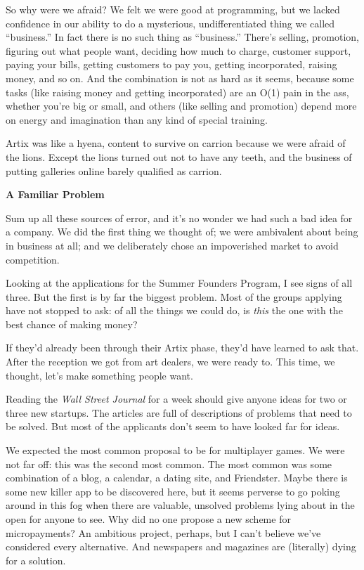 \documentclass[12pt]{book}
\begin{document}
So why were we afraid? We felt we were good at programming, but we
lacked confidence in our ability to do a mysterious, undifferentiated
thing we called ``business.'' In fact there is no such thing as
``business.'' There's selling, promotion, figuring out what people want,
deciding how much to charge, customer support, paying your bills,
getting customers to pay you, getting incorporated, raising money, and
so on. And the combination is not as hard as it seems, because some
tasks (like raising money and getting incorporated) are an O(1) pain in
the ass, whether you're big or small, and others (like selling and
promotion) depend more on energy and imagination than any kind of
special training.

Artix was like a hyena, content to survive on carrion because we were
afraid of the lions. Except the lions turned out not to have any teeth,
and the business of putting galleries online barely qualified as
carrion.

\textbf{A Familiar Problem}

Sum up all these sources of error, and it's no wonder we had such a bad
idea for a company. We did the first thing we thought of; we were
ambivalent about being in business at all; and we deliberately chose an
impoverished market to avoid competition.

Looking at the applications for the Summer Founders Program, I see signs
of all three. But the first is by far the biggest problem. Most of the
groups applying have not stopped to ask: of all the things we could do,
is \emph{this} the one with the best chance of making money?

If they'd already been through their Artix phase, they'd have learned to
ask that. After the reception we got from art dealers, we were ready to.
This time, we thought, let's make something people want.

Reading the \emph{Wall Street Journal} for a week should give anyone
ideas for two or three new startups. The articles are full of
descriptions of problems that need to be solved. But most of the
applicants don't seem to have looked far for ideas.

We expected the most common proposal to be for multiplayer games. We
were not far off: this was the second most common. The most common was
some combination of a blog, a calendar, a dating site, and Friendster.
Maybe there is some new killer app to be discovered here, but it seems
perverse to go poking around in this fog when there are valuable,
unsolved problems lying about in the open for anyone to see. Why did no
one propose a new scheme for micropayments? An ambitious project,
perhaps, but I can't believe we've considered every alternative. And
newspapers and magazines are (literally) dying for a solution.
\end{document}
